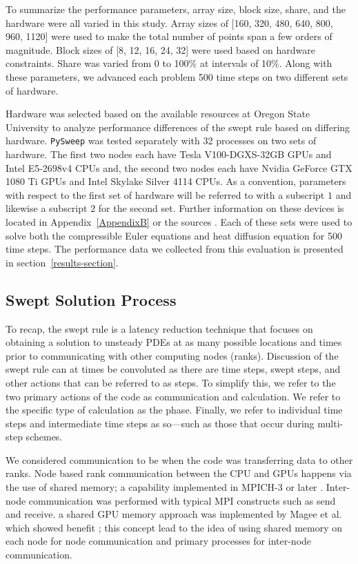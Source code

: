 \documentclass[review]{elsarticle}
\def\oldCPU{s}
\def\oldGPU{s}
\def\newCPU{s}
\def\newGPU{s}
\def\pysweep{\texttt{PySweep}}
\def\oldCPU{Intel Skylake Silver 4114} %
\def\oldGPU{Nvidia GeForce GTX 1080 Ti}
\def\newCPU{Intel E5-2698v4} %
\def\newGPU{Tesla V100-DGXS-32GB}
\begin{document}
\par
To summarize the performance parameters, array size, block size, share, and the hardware were all varied in this study. Array sizes of [160, 320, 480, 640, 800, 960, 1120] were used to make the total number of points span a few orders of magnitude. Block sizes of [8, 12, 16, 24, 32] were used based on hardware constraints. Share was varied from 0 to 100\% at intervals of 10\%. Along with these parameters, we advanced each problem 500 time steps on two different sets of hardware.

\par
Hardware was selected based on the available resources at Oregon State University to analyze performance differences of the swept rule based on differing hardware. \pysweep{} was tested separately with 32 processes on two sets of hardware. The first two nodes each have \newGPU{} GPUs and \newCPU{} CPUs and, the second two nodes each have \oldGPU{} GPUs and \oldCPU{} CPUs. As a convention, parameters with respect to the first set of hardware will be referred to with a subscript $1$ and likewise a subscript $2$ for the second set. Further information on these devices is located in Appendix~\ref{AppendixB} or the sources \cite{Intel123550,Intel91753,NVIDIANVIDIA,GeForceGeForce}. Each of these sets were used to solve both the compressible Euler equations and heat diffusion equation for 500 time steps. The performance data we collected from this evaluation is presented in section~\ref{results-section}.

\subsection{Swept Solution Process}
\label{swept-process-section}
To recap, the swept rule is a latency reduction technique that focuses on obtaining a solution to unsteady PDEs at as many possible locations and times prior to communicating with other computing nodes (ranks). Discussion of the swept rule can at times be convoluted as there are time steps, swept steps, and other actions that can be referred to as steps. To simplify this, we refer to the two primary actions of the code as communication and calculation. We refer to the specific type of calculation as the phase. Finally, we refer to individual time steps and intermediate time steps as so---such as those that occur during multi-step schemes. 

\par
 We considered communication to be when the code was transferring data to other ranks. Node based rank communication between the CPU and GPUs happens via the use of shared memory; a capability implemented in MPICH-3 or later \cite{Hoefler2013MPIMemory}. Inter-node communication was performed with typical MPI constructs such as send and receive. a shared GPU memory approach was implemented by Magee et al. which showed benefit \cite{Magee2018AcceleratingDecomposition}; this concept lead to the idea of using shared memory on each node for node communication and primary processes for inter-node communication.
 
\end{document}
